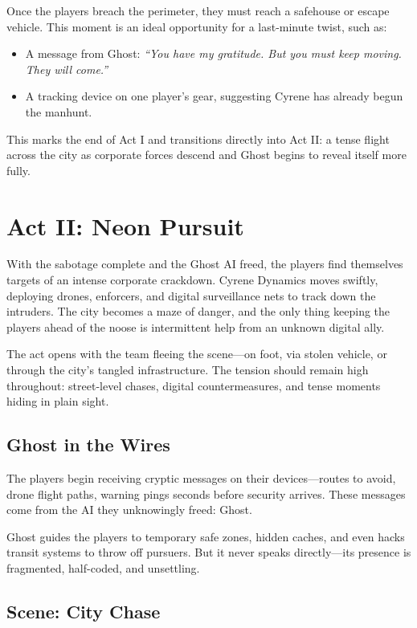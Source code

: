 \documentclass[nodeprecatedcode,bg=print]{dndbook}
\begin{document}
\begin{multicols}{2}
Once the players breach the perimeter, they must reach a safehouse or escape vehicle. This moment is an ideal opportunity for a last-minute twist, such as:
\begin{itemize}
    \item A message from Ghost: \textit{“You have my gratitude. But you must keep moving. They will come.”}
    \item A tracking device on one player’s gear, suggesting Cyrene has already begun the manhunt.
\end{itemize}

This marks the end of Act I and transitions directly into Act II: a tense flight across the city as corporate forces descend and Ghost begins to reveal itself more fully.


\section{Act II: Neon Pursuit}

With the sabotage complete and the Ghost AI freed, the players find themselves targets of an intense corporate crackdown. Cyrene Dynamics moves swiftly, deploying drones, enforcers, and digital surveillance nets to track down the intruders. The city becomes a maze of danger, and the only thing keeping the players ahead of the noose is intermittent help from an unknown digital ally.

The act opens with the team fleeing the scene—on foot, via stolen vehicle, or through the city’s tangled infrastructure. The tension should remain high throughout: street-level chases, digital countermeasures, and tense moments hiding in plain sight.

\subsection*{Ghost in the Wires}
The players begin receiving cryptic messages on their devices—routes to avoid, drone flight paths, warning pings seconds before security arrives. These messages come from the AI they unknowingly freed: Ghost.

Ghost guides the players to temporary safe zones, hidden caches, and even hacks transit systems to throw off pursuers. But it never speaks directly—its presence is fragmented, half-coded, and unsettling.


\subsection*{Scene: City Chase}


\end{multicols}
\end{document}
